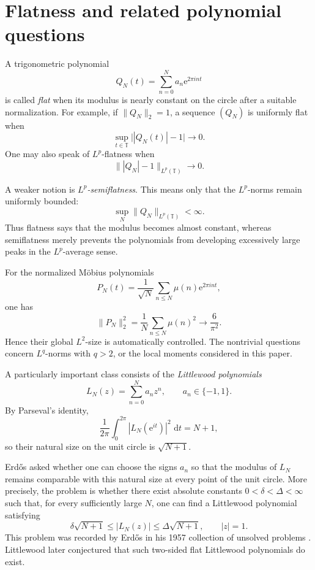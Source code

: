 \documentclass[11pt]{article}
\theoremstyle{remark}
\newcommand{\T}{\mathbb T}
\newcommand{\e}{\mathrm e}
\newcommand{\dd}{\,\mathrm d}
\begin{document}
\section{Flatness and related polynomial questions}
\label{sec:flatness}

A trigonometric polynomial
\[
 Q_N(t)=\sum_{n=0}^{N}a_n\e^{2\pi int}
\]
is called \emph{flat} when its modulus is nearly constant on the
circle after a suitable normalization.  For example, if
\(\|Q_N\|_2=1\), a sequence \((Q_N)\) is uniformly flat when
\[
 \sup_{t\in\T}\bigl||Q_N(t)|-1\bigr|\longrightarrow0.
\]
One may also speak of \(L^p\)-flatness when
\[
 \bigl\||Q_N|-1\bigr\|_{L^p(\T)}\longrightarrow0.
\]

A weaker notion is \emph{\(L^p\)-semiflatness}.  This means only that
the \(L^p\)-norms remain uniformly bounded:
\[
 \sup_N\|Q_N\|_{L^p(\T)}<\infty.
\]
Thus flatness says that the modulus becomes almost constant, whereas
semiflatness merely prevents the polynomials from developing
excessively large peaks in the \(L^p\)-average sense.

For the normalized Möbius polynomials
\[
 P_N(t)=\frac1{\sqrt N}\sum_{n\leq N}\mu(n)\e^{2\pi int},
\]
one has
\[
 \|P_N\|_2^2
 =
 \frac1N\sum_{n\leq N}\mu(n)^2
 \longrightarrow\frac6{\pi^2}.
\]
Hence their global \(L^2\)-size is automatically controlled.  The
nontrivial questions concern \(L^q\)-norms with \(q>2\), or the local
moments considered in this paper.

\label{sec:erdos-flat}

A particularly important class consists of the \emph{Littlewood
polynomials}
\[
 L_N(z)=\sum_{n=0}^{N}a_nz^n,
 \qquad a_n\in\{-1,1\}.
\]
By Parseval's identity,
\[
 \frac1{2\pi}\int_0^{2\pi}
 |L_N(\e^{it})|^2\,\dd t=N+1,
\]
so their natural size on the unit circle is \(\sqrt{N+1}\).

Erd\H{o}s asked whether one can choose the signs \(a_n\) so that the
modulus of \(L_N\) remains comparable with this natural size at every
point of the unit circle.  More precisely, the problem is whether
there exist absolute constants \(0<\delta<\Delta<\infty\) such that,
for every sufficiently large \(N\), one can find a Littlewood
polynomial satisfying
\begin{equation}\label{eq:erdos-littlewood-flat}
 \delta\sqrt{N+1}
 \leq |L_N(z)|
 \leq \Delta\sqrt{N+1},
 \qquad |z|=1.
\end{equation}
This problem was recorded by Erd\H{o}s in his 1957 collection of
unsolved problems \cite{Erdos1957}.  Littlewood later conjectured that
such two-sided flat Littlewood polynomials do exist.
\end{document}
